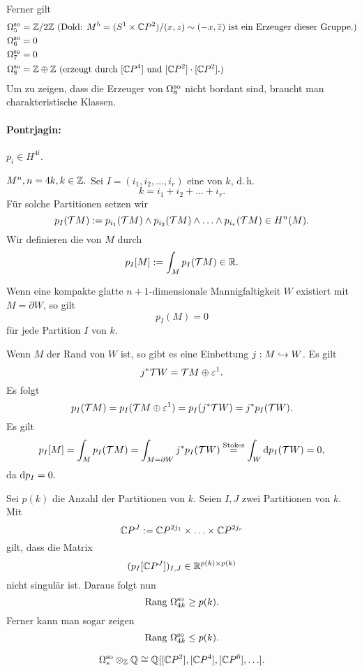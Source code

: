 Ferner gilt
\begin{align*}
\Omega^{\mathrm{so}}_5 &= \mathbb{Z}/2\mathbb{Z}~ (\text{Dold: }M^5 = (S^1 \times \mathbb{C} P^2)/(x,z) \sim (-x, \overline{z})\text{ ist ein Erzeuger dieser Gruppe.})\\
\Omega^{\mathrm{so}}_6 &= 0\\
\Omega^{\mathrm{so}}_7&= 0\\
\Omega^{\mathrm{so}}_8 &= \mathbb{Z} \oplus \mathbb{Z}~ (\text{erzeugt durch }[\mathbb{C} P^4] \text{ und } [\mathbb{C} P^2]\cdot [\mathbb{C} P^2].)
\end{align*}
Um zu zeigen, dass die Erzeuger von $\Omega^{\mathrm{so}}_8$ nicht bordant sind, braucht man charakteristische Klassen.\\
\paragraph{Pontrjagin:} $p_i \in H^{4i}$.

$M^n, n = 4k, k \in \mathbb{Z}.$ Sei $I = (i_1, i_2, \ldots, i_r)$ eine  von $k$, d.\,h.
\[ k = i_1 + i_2 + \ldots + i_r. \]
Für solche Partitionen setzen wir
\[ p_I (\mathcal{T} M) := p_{i_1}(\mathcal{T} M) \wedge p_{i_2}(\mathcal{T} M) \wedge \ldots \wedge p_{i_r}(\mathcal{T} M) \in H^n(M). \]
Wir definieren die  von $M$ durch
\[ p_I[M] := \int_M p_I(\mathcal{T} M) \in \mathbb{R}. \]

Wenn eine kompakte glatte $n+1$-dimensionale Mannigfaltigkeit $W$ existiert mit $M = \partial W$, so gilt
\[ p_I(M) = 0 \]
für jede Partition $I$ von $k$.
\begin{Beweis}{}
Wenn $M$ der Rand von $W$ ist, so gibt es eine Einbettung $j : M \overset{}{\hookrightarrow} W$. Es gilt
\[ j^*\mathcal{T} W = \mathcal{T} M \oplus \varepsilon^1. \]
Es folgt
\[ p_I(\mathcal{T} M) = p_I(\mathcal{T} M \oplus \varepsilon^1) = p_I(j^* \mathcal{T} W) = j^*p_I(\mathcal{T} W). \]
Es gilt
\[ p_I[M]
= \int_M p_I(\mathcal{T} M)
= \int_{M = \partial W} j^*p_I(\mathcal{T} W)
\overset{\mathrm{Stokes}}{=} \int_W \text{d} p_I (\mathcal{T} W) = 0,
 \]
da $\text{d} p_I = 0.$
\end{Beweis}

Sei $p(k)$ die Anzahl der Partitionen von $k$. Seien $I,J$ zwei Partitionen von $k$. Mit
\[ \mathbb{C} P^J := \mathbb{C} P^{2j_1} \times \ldots \times \mathbb{C} P^{2j_r} \]
gilt, dass die Matrix
\[ (p_I[\mathbb{C} P^J])_{I,J} \in \mathbb{R}^{p(k) \times p(k)} \]
nicht singulär ist. Daraus folgt nun
\[ \text{Rang } \Omega^{\mathrm{so}}_{4k} \geq p(k). \]
Ferner kann man sogar zeigen
\[ \text{Rang } \Omega^{\mathrm{so}}_{4k} \leq p(k). \]

\[ \Omega^{\mathrm{so}}_*\otimes_{\mathbb{Z}} \mathbb{Q} \overset{}{\cong} \mathbb{Q}[[\mathbb{C} P^2], [\mathbb{C} P^4], [\mathbb{C} P^6], \ldots ].  \]